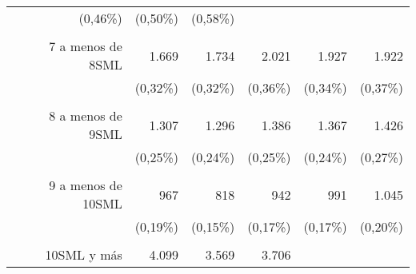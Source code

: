 \begin{tabular}{llllll}
  \multicolumn{1}{r}{(0,46\%)} &
  \multicolumn{1}{r}{(0,50\%)} &
  \multicolumn{1}{r}{(0,58\%)} \\
\multicolumn{1}{r}{} &
  \multicolumn{1}{|r}{} &
  \multicolumn{1}{r}{} &
  \multicolumn{1}{r}{} &
  \multicolumn{1}{r}{} &
  \multicolumn{1}{r}{} \\
\multicolumn{1}{r}{7 a menos de 8SML\hspace{1em}} &
  \multicolumn{1}{|r}{1.669} &
  \multicolumn{1}{r}{1.734} &
  \multicolumn{1}{r}{2.021} &
  \multicolumn{1}{r}{1.927} &
  \multicolumn{1}{r}{1.922} \\
\multicolumn{1}{r}{} &
  \multicolumn{1}{|r}{(0,32\%)} &
  \multicolumn{1}{r}{(0,32\%)} &
  \multicolumn{1}{r}{(0,36\%)} &
  \multicolumn{1}{r}{(0,34\%)} &
  \multicolumn{1}{r}{(0,37\%)} \\
\multicolumn{1}{r}{} &
  \multicolumn{1}{|r}{} &
  \multicolumn{1}{r}{} &
  \multicolumn{1}{r}{} &
  \multicolumn{1}{r}{} &
  \multicolumn{1}{r}{} \\
\multicolumn{1}{r}{8 a menos de 9SML\hspace{1em}} &
  \multicolumn{1}{|r}{1.307} &
  \multicolumn{1}{r}{1.296} &
  \multicolumn{1}{r}{1.386} &
  \multicolumn{1}{r}{1.367} &
  \multicolumn{1}{r}{1.426} \\
\multicolumn{1}{r}{} &
  \multicolumn{1}{|r}{(0,25\%)} &
  \multicolumn{1}{r}{(0,24\%)} &
  \multicolumn{1}{r}{(0,25\%)} &
  \multicolumn{1}{r}{(0,24\%)} &
  \multicolumn{1}{r}{(0,27\%)} \\
\multicolumn{1}{r}{} &
  \multicolumn{1}{|r}{} &
  \multicolumn{1}{r}{} &
  \multicolumn{1}{r}{} &
  \multicolumn{1}{r}{} &
  \multicolumn{1}{r}{} \\
\multicolumn{1}{r}{9 a menos de 10SML\hspace{1em}} &
  \multicolumn{1}{|r}{967} &
  \multicolumn{1}{r}{818} &
  \multicolumn{1}{r}{942} &
  \multicolumn{1}{r}{991} &
  \multicolumn{1}{r}{1.045} \\
\multicolumn{1}{r}{} &
  \multicolumn{1}{|r}{(0,19\%)} &
  \multicolumn{1}{r}{(0,15\%)} &
  \multicolumn{1}{r}{(0,17\%)} &
  \multicolumn{1}{r}{(0,17\%)} &
  \multicolumn{1}{r}{(0,20\%)} \\
\multicolumn{1}{r}{} &
  \multicolumn{1}{|r}{} &
  \multicolumn{1}{r}{} &
  \multicolumn{1}{r}{} &
  \multicolumn{1}{r}{} &
  \multicolumn{1}{r}{} \\
\multicolumn{1}{r}{10SML y más\hspace{1em}} &
  \multicolumn{1}{|r}{4.099} &
  \multicolumn{1}{r}{3.569} &
  \multicolumn{1}{r}{3.706} &

\end{tabular}
